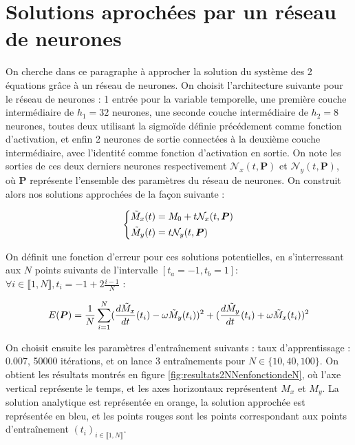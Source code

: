 \documentclass[12pt]{report}
\begin{document}
\section{Solutions aprochées par un réseau de neurones}
\label{section:2_NN}

On cherche dans ce paragraphe à approcher la solution du système des 2 équations grâce à un réseau de neurones.
On choisit l'architecture suivante pour le réseau de neurones :
1 entrée pour la variable temporelle, une première couche intermédiaire de $h_1=32$ neurones, une seconde couche intermédiaire de $h_2=8$ neurones, toutes deux utilisant la sigmoïde définie précédement comme fonction d'activation, et enfin 2 neurones de sortie connectées à la deuxième couche intermédiaire, avec l'identité comme fonction d'activation en sortie.
On note les sorties de ces deux derniers neurones respectivement $\mathcal{N}_x(t, \bm{P})$ et $\mathcal{N}_y(t, \bm{P})$, où $\bm{P}$ représente l'ensemble des paramètres du réseau de neurones.
On construit alors nos solutions approchées de la façon suivante :

\begin{equation}
    \left\{
    \begin{aligned}
        \Tilde{M}_x(t) & = M_0+ t\mathcal{N}_x(t, \bm{P}) \\
        \Tilde{M}_y(t) & = t\mathcal{N}_y(t, \bm{P})
    \end{aligned}
    \right.
    \label{eq:solution_2_NN}
\end{equation}

On définit une fonction d'erreur pour ces solutions potentielles, en s'interressant aux $N$ points suivants de l'intervalle $[t_a=-1, t_b=1]$:
$\forall i \in\llbracket 1,N \rrbracket, t_i = -1 + 2\frac{i-1}{N} $ :

\begin{equation}
    E(\bm{P}) = \frac{1}{N}\sum_{i=1}^{N} (\frac{d\Tilde{M}_x}{dt}(t_i) - \omega \Tilde{M}_y(t_i))^2 + (\frac{d\Tilde{M}_y}{dt}(t_i) + \omega \Tilde{M}_x(t_i))^2
    \label{eq:erreur_2_NN}
\end{equation}


On choisit ensuite les paramètres d'entraînement suivants : taux d'apprentissage : 0.007, 50000 itérations, et on lance 3 entraînements pour $N \in \{10,40,100\}$.
On obtient les résultats montrés en figure \ref{fig:resultats2NNenfonctiondeN}, où l'axe vertical représente le temps, et les axes horizontaux représentent $M_x$ et $M_y$.
La solution analytique est représentée en orange, la solution approchée est représentée en bleu, et les points rouges sont les points correspondant aux points d'entraînement $(t_i)_{i \in \llbracket 1, N \rrbracket}$.
\end{document}
